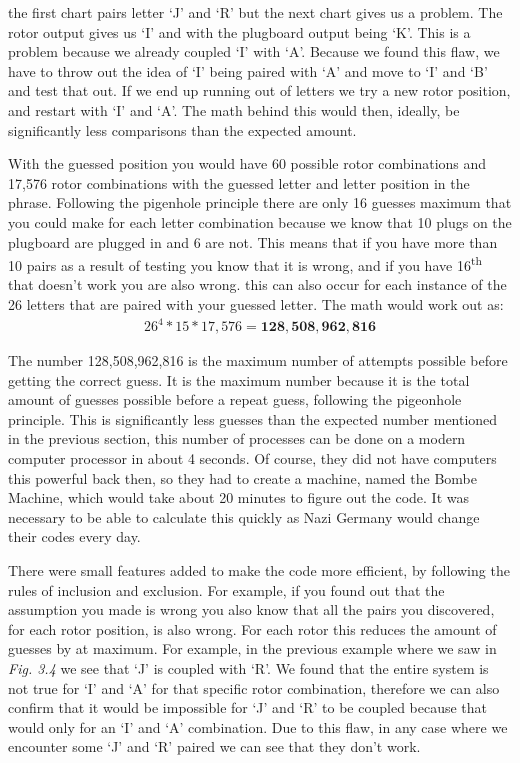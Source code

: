 \documentclass[11pt]{article}
\newcommand\tab[1][0.5cm]{\hspace*{#1}}
\begin{document}
\tab the first chart pairs letter `J' and `R' but the next chart gives us a problem. The rotor output gives us `I' and with the plugboard output being `K'. This is a problem because we already coupled `I' with `A'. Because we found this flaw, we have to throw out the idea of `I' being paired with `A' and move to `I' and `B' and test that out. If we end up running out of letters we try a new rotor position, and restart with `I' and `A'. The math behind this would then, ideally, be significantly less comparisons than the expected amount. 

\tab With the guessed position you would have 60 possible rotor combinations and 17,576 rotor combinations with the guessed letter and letter position in the phrase. Following the pigenhole principle there are only 16 guesses maximum that you could make for each letter combination because we know that 10 plugs on the plugboard are plugged in and 6 are not. This means that if you have more than 10 pairs as a result of testing you know that it is wrong, and if you have 16\textsuperscript{th} that doesn't work you are also wrong. this can also occur for each instance of the 26 letters that are paired with your guessed letter. The math would work out as:
\begin{align*}
	26^4*15*17,576=\bm{128,508,962,816}
\end{align*}

\tab The number 128,508,962,816 is the maximum number of attempts possible before getting the correct guess. It is the maximum number because it is the total amount of guesses possible before a repeat guess, following the pigeonhole principle. This is significantly less guesses than the expected number mentioned in the previous section, this number of processes can be done on a modern computer processor in about 4 seconds. Of course, they did not have computers this powerful back then, so they had to create a machine, named the Bombe Machine, which would take about 20 minutes to figure out the code. It was necessary to be able to calculate this quickly as Nazi Germany would change their codes every day.

\tab There were small features added to make the code more efficient, by following the rules of inclusion and exclusion. For example, if you found out that the assumption you made is wrong you also know that all the pairs you discovered, for each rotor position, is also wrong. For each rotor this reduces the amount of guesses by at maximum. For example, in the previous example where we saw in \textit{Fig. 3.4} we see that `J' is coupled with `R'. We found that the entire system is not true for `I' and `A' for that specific rotor combination, therefore we can also confirm that it would be impossible for `J' and `R' to be coupled because that would only for an `I' and `A' combination. Due to this flaw, in any case where we encounter some `J' and `R' paired we can see that they don't work.
\end{document}
